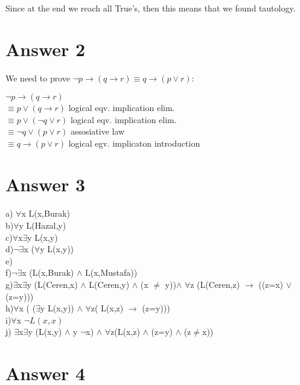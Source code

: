 \documentclass[12pt]{article}
\begin{document}
\\
Since at the end we reach all True's, then this means that we found tautology.


\section*{Answer 2}
	We need to prove \(\neg{p} \rightarrow (q\rightarrow r ) \equiv q \rightarrow(p \vee r):\)
	
		\(\neg{p} \rightarrow (q\rightarrow r )\) \\
		\(\equiv p \vee (q \rightarrow r)\)     logical eqv. implication elim. \\
		\(\equiv p \vee (\neg{q} \vee r)\)   logical eqv. implication elim.\\
		\(\equiv \neg{q} \vee ( p\vee r)\)  assosiative law\\
		\(\equiv q\rightarrow ( p\vee r)\) logical egv. implicaton introduction
		
	
	
	

\section*{Answer 3}
a) $\forall$x L(x,Burak)\\
b)$\forall$y L(Hazal,y)\\
c)$\forall$x$\exists$y L(x,y) \\
d)\(\neg{\exists}\)x ($\forall$y L(x,y))\\
e)\\
f)\(\neg{\exists}\)x (L(x,Burak) $\wedge$ L(x,Mustafa))\\
g)$\exists$x$\exists$y (L(Ceren,x) $\wedge$ L(Ceren,y) $\wedge$ (x $\neq$ y))$\wedge$ $\forall$z (L(Ceren,z) $\rightarrow$ ((z=x) $\vee$ (z=y)))\\
h)$\forall$x ( ($\exists$y L(x,y)) $\wedge$ $\forall$z( L(x,z) $\rightarrow$ (z=y)))\\
i)$\forall$x $\neg{L(x,x)}$\\
j) $\exists$x$\exists$y (L(x,y) $\wedge$ y $\neg$x) $\wedge$ $\forall$z(L(x,z) $\wedge$ (z=y) $\wedge$ (z$\neq$x))\\

\section*{Answer 4}
\end{document}

